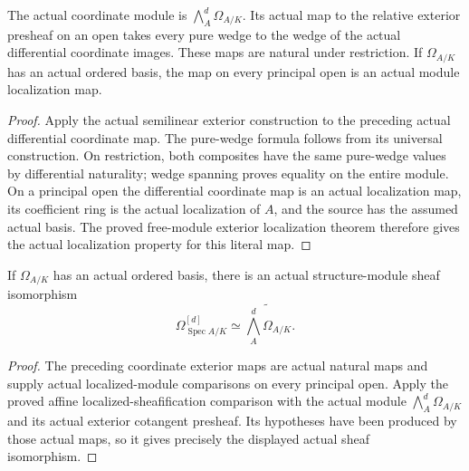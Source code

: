 \begin{lemma}
\label{sc0-canonical-port:ext:affine-exterior-coordinate-map}
\leanok
The actual coordinate module is \(\bigwedge_A^d\Omega_{A/K}\).
Its actual map to the relative exterior presheaf on
an open takes every pure wedge to the wedge of the
actual differential coordinate images. These maps
are natural under restriction. If \(\Omega_{A/K}\)
has an actual ordered basis, the map on every
principal open is an actual module localization map.
\end{lemma}
\begin{proof}
Apply the actual semilinear exterior construction
to the preceding actual differential coordinate map.
The pure-wedge formula follows from its universal
construction. On restriction, both composites have
the same pure-wedge values by differential naturality;
wedge spanning proves equality on the entire module.
On a principal open the differential coordinate map
is an actual localization map, its coefficient ring
is the actual localization of \(A\), and the source
has the assumed actual basis. The proved free-module
exterior localization theorem therefore gives the
actual localization property for this literal map.
\end{proof}

\begin{theorem}
\label{sc0-canonical-port:ext:actual-affine-exterior-sheaf-comparison}
\leanok
If \(\Omega_{A/K}\) has an actual ordered basis,
there is an actual structure-module sheaf isomorphism
\[
 \Omega_{\operatorname{Spec}A/K}^{[d]}
 \simeq\widetilde{\bigwedge_A^d\Omega_{A/K}}.
\]
\end{theorem}
\begin{proof}
The preceding coordinate exterior maps are actual
natural maps and supply actual localized-module
comparisons on every principal open. Apply the
proved affine localized-sheafification comparison
with the actual module \(\bigwedge_A^d\Omega_{A/K}\)
and its actual exterior cotangent presheaf.
Its hypotheses have been produced by those actual
maps, so it gives precisely the displayed actual
sheaf isomorphism.
\end{proof}


